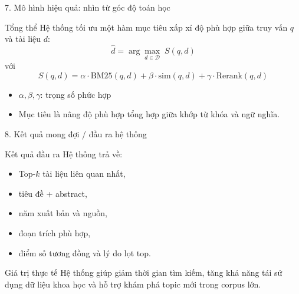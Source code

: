 \documentclass[aspectratio=169]{beamer}
\begin{document}
\begin{frame}{7. Mô hình hiệu quả: nhìn từ góc độ toán học}
  \begin{block}{Tổng thể}
    Hệ thống tối ưu một hàm mục tiêu xấp xỉ độ phù hợp giữa truy vấn $q$ và tài liệu $d$:
    \begin{equation}
      \hat{d} = \arg\max_{d \in \mathcal{D}} \; S(q,d)
    \end{equation}
    với
    \begin{equation}
      S(q,d) = \alpha \cdot \mathrm{BM25}(q,d) + \beta \cdot \mathrm{sim}(q,d) + \gamma \cdot \mathrm{Rerank}(q,d)
    \end{equation}
  \end{block}

  \begin{itemize}
    \item $\alpha, \beta, \gamma$: trọng số phức hợp\
    \item Mục tiêu là nâng độ phù hợp tổng hợp giữa khớp từ khóa và ngữ nghĩa.\
  \end{itemize}
\end{frame}

\begin{frame}{8. Kết quả mong đợi / đầu ra hệ thống}
  \begin{block}{Kết quả đầu ra}
    Hệ thống trả về:
    \begin{itemize}
      \item Top-$k$ tài liệu liên quan nhất,\
      \item tiêu đề + abstract,\
      \item năm xuất bản và nguồn,\
      \item đoạn trích phù hợp,\
      \item điểm số tương đồng và lý do lọt top.\
    \end{itemize}
  \end{block}

  \vspace{0.3cm}
  \begin{block}{Giá trị thực tế}
    Hệ thống giúp giảm thời gian tìm kiếm, tăng khả năng tái sử dụng dữ liệu khoa học và hỗ trợ khám phá topic mới trong corpus lớn.
  \end{block}
\end{frame}
\end{document}
